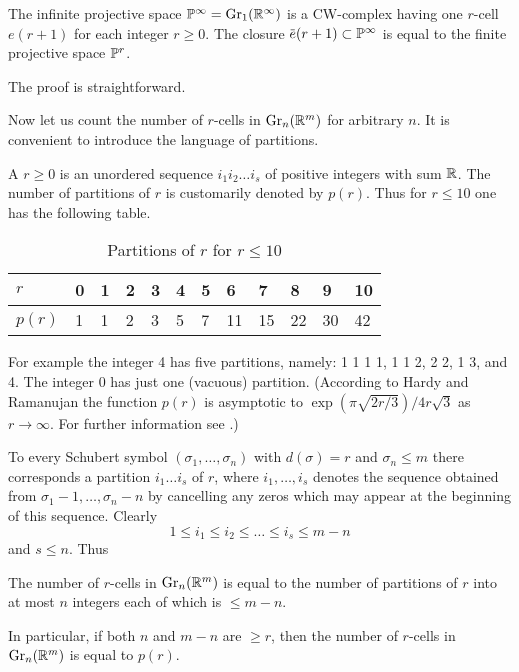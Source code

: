 \documentclass[../main]{subfiles}
\begin{document}
\begin{corollary}
\label{cor:06.05}
The infinite projective space $\mathbb{P}^{\infty}=\operatorname{Gr}_{1}(\mathbb R^\infty)$ is a CW-complex having one $r$-cell $e(r+1)$ for each integer $r \geq 0$. The closure $\xoverline{e}(r+1) \subset \projective^{\infty}$ is equal to the finite projective space $\mathbb{P}^{r}$.
\end{corollary}
The proof is straightforward.

Now let us count the number of $r$-cells in $\operatorname{Gr}_{n}(\mathbb R^m)$ for arbitrary $n$. It is convenient to introduce the language of partitions. 
\pagebreak
\begin{customdef}{6.6}
\label{def:06.06}
A  $r \geq 0$ is an unordered sequence $i_{1} i_{2} \dots i_{s}$ of positive integers with sum $\mathbb R$. The number of partitions of $r$ is customarily denoted by $p(r) $. Thus for $r \leq 10$ one has the following table.

\begin{table}[!h]
\centering
\begin{tabular}{|l|lllllllllll|}
	\hline
	$r$ & 0 & 1 & 2 & 3 & 4 & 5 & 6 & 7 & 8 & 9 & 10 \\
	\hline
	$p(r)$ & 1 & 1 & 2 & 3 & 5 & 7 & 11 & 15 & 22 & 30 & 42 \\
	\hline
\end{tabular}
\caption{Partitions of $r$ for $r\leq 10$}
\end{table}
\end{customdef}
For example the integer 4 has five partitions, namely: 1 1 1 1, 1 1 2, 2 2, 1 3, and 4. The integer 0 has just one (vacuous) partition. (According to Hardy and Ramanujan the function $p(r)$ is asymptotic to $\exp (\pi \sqrt{2 r / 3}) / 4 r \sqrt{3}$ as $r\rightarrow \infty$. For further information see \cite{ostmann1956}.)

To every Schubert symbol $(\sigma_{1},\dots, \sigma_{n})$ with $d(\sigma)=r$ and $\sigma_{n} \leq m$ there corresponds a partition $i_{1}\dots i_{s}$ of $r$, where $i_{1},\dots, i_{s}$ denotes the sequence obtained from $\sigma_{1}-1,\dots, \sigma_{n}-n$ by cancelling any zeros which may appear at the beginning of this sequence. Clearly
\[
1 \leq i_{1} \leq i_{2} \leq\dots \leq i_{s} \leq m-n
\]
and $s \leq n $. Thus
\setcounter{theorem}{6}
\begin{corollary}
\label{cor:06.07}
The number of $r$-cells in $\operatorname{Gr}_{n}(\mathbb R^m)$ is equal to the number of partitions of $r$ into at most $n$ integers each of which is $\leq m-n$.
\end{corollary}
In particular, if both $n$ and $m-n$ are $\geq r$, then the number of $r$-cells in $\operatorname{Gr}_{n}(\mathbb R^m)$ is equal to $p(r)$.
\end{document}
